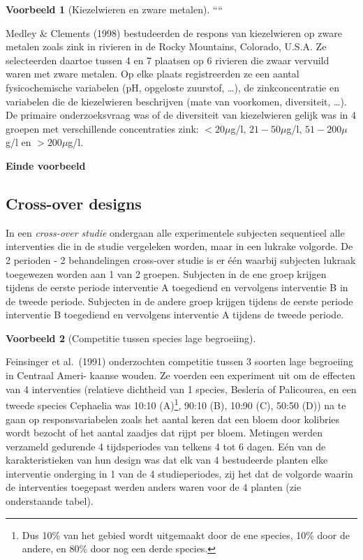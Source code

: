 \documentclass[
  12pt,dutch,coursenotes]{book}
\theoremstyle{definition}
\theoremstyle{definition}
\newtheorem{example}{Voorbeeld}[chapter]
\theoremstyle{definition}
\theoremstyle{definition}
\theoremstyle{remark}
\begin{document}
\begin{example}[Kiezelwieren en zware metalen]
\protect\hypertarget{exm:unnamed-chunk-75}{}{\label{exm:unnamed-chunk-75} {} }````

Medley \& Clements (1998) bestudeerden de respons van kiezelwieren
op zware metalen zoals zink in rivieren in de Rocky Mountains, Colorado, U.S.A.
Ze selecteerden daartoe tussen 4 en 7 plaatsen op 6 rivieren die zwaar vervuild
waren met zware metalen. Op elke plaats registreerden ze een aantal fysicochemische
variabelen (pH, opgeloste zuurstof, \ldots), de zinkconcentratie en variabelen die de
kiezelwieren beschrijven (mate van voorkomen, diversiteit, \ldots).
De primaire onderzoeksvraag was of de diversiteit van kiezelwieren gelijk was in
4 groepen met verschillende concentraties zink:
\(<20 \mu\)g/l, \(21-50 \mu\)g/l, \(51-200 \mu\)g/l en \(>200 \mu\)g/l.

\textbf{Einde voorbeeld}

\hypertarget{cross-over-designs}{%
\subsection{Cross-over designs}\label{cross-over-designs}}

In een \emph{cross-over studie} ondergaan alle experimentele subjecten sequentieel alle
interventies die in de studie vergeleken worden, maar in een lukrake
volgorde. De 2 perioden - 2 behandelingen cross-over studie is er één
waarbij subjecten lukraak toegewezen worden aan 1 van 2 groepen.
Subjecten in de ene groep krijgen tijdens de eerste periode interventie A
toegediend en vervolgens interventie B in de tweede periode. Subjecten in
de andere groep krijgen tijdens de eerste periode interventie B toegediend
en vervolgens interventie A tijdens de tweede periode.
\end{example}
\begin{example}[Competitie tussen species lage begroeiing]
\protect\hypertarget{exm:unnamed-chunk-76}{}{\label{exm:unnamed-chunk-76} {} }
\end{example}

Feinsinger et al.~(1991) onderzochten competitie tussen 3 soorten lage begroeiing in Centraal Ameri- kaanse wouden. Ze voerden een experiment uit om de effecten van 4 interventies (relatieve dichtheid van 1 species, Besleria of Palicourea, en een tweede species Cephaelia was 10:10 (A)\footnote{Dus 10\% van het gebied wordt uitgemaakt door de ene species, 10\% door de andere, en 80\% door nog een derde species.}, 90:10 (B), 10:90 (C), 50:50 (D)) na te gaan op responsvariabelen zoals het aantal keren dat een bloem door kolibries wordt bezocht of het aantal zaadjes dat rijpt per bloem. Metingen werden verzameld gedurende 4 tijdsperiodes van telkens 4 tot 6 dagen. Eén van de karakteristieken van hun design was dat elk van 4 bestudeerde planten elke interventie onderging in 1 van de 4 studieperiodes, zij het dat de volgorde waarin de interventies toegepast werden anders waren voor de 4 planten (zie onderstaande tabel).
\end{document}
